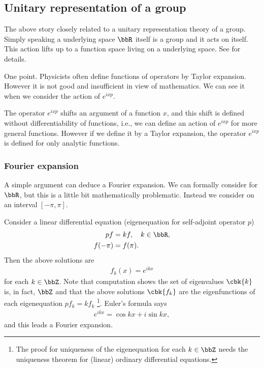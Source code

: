 \documentclass[openany, a4paper, oneside]{jsbook}
\begin{document}
\subsection{Unitary representation of a group}

The above story closely related to a unitary representation theory of a group.
Simply speaking a underlying space $\bbR$ itself is a group
and it acts on itself.
This action lifts up to a function space living on a underlying space.
See \cite{KobayashiOshima1} for details.

One point.
Physicists often define functions of operators by Taylor expansion.
However it is not good and insufficient in view of mathematics.
We can see it when we consider the action of $e^{ixp}$.

The operator $e^{i x p}$ shifts an argument of a function $x$,
and this shift is defined without differentiability of functions,
i.e., we can define an action of $e^{ixp}$ for more general functions.
However if we define it by a Taylor expansion,
the operator $e^{ixp}$ is defined for only analytic functions.
\subsubsection{Fourier expansion}

A simple argument can deduce a Fourier expansion.
We can formally consider for $\bbR$,
but this is a little bit mathematically problematic.
Instead we consider on an interval $[ - \pi, \pi]$.

Consider a linear differential equation (eigenequation for
self-adjoint operator $p$)
\begin{align}
 p f
 &=
 k f, \quad k \in \bbR, \\
 f(-\pi)
 &=
 f(\pi).
\end{align}
Then the above solutions are
\begin{align}
 f_k(x)
 =
 e^{ikx}
\end{align}
for each $k \in \bbZ$.
Note that computation shows the set of eigenvalues $\cbk{k}$ is, in fact, $\bbZ$ and that
the above solutions $\cbk{f_k}$ are the eigenfunctions of each eigenequation $p f_k = k f_k$ \footnote{The proof for uniqueness of the eigenequation for each $k \in \bbZ$ needs the
uniqueness theorem for (linear) ordinary differential equations.}.
Euler's formula says
\begin{align}
 e^{ikx}
 =
 \cos kx + i \sin kx,
\end{align}
and this leads a Fourier expansion.
\end{document}
